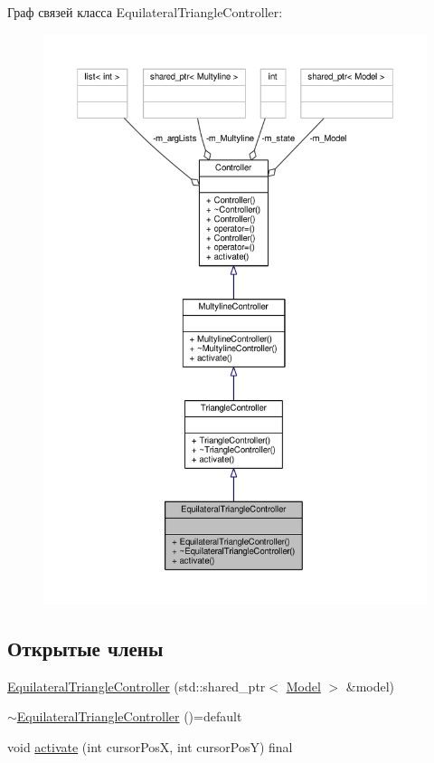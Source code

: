 Граф связей класса Equilateral\-Triangle\-Controller\-:
\nopagebreak
\begin{figure}[H]
\begin{center}
\leavevmode
\includegraphics[width=350pt]{class_equilateral_triangle_controller__coll__graph}
\end{center}
\end{figure}
\subsection*{Открытые члены}
\begin{DoxyCompactItemize}
\item 
\hyperlink{class_equilateral_triangle_controller_a823715abcc954d05ea572f5527744e91}{Equilateral\-Triangle\-Controller} (std\-::shared\-\_\-ptr$<$ \hyperlink{class_model}{Model} $>$ \&model)
\item 
\hyperlink{class_equilateral_triangle_controller_a9cba9b68e881d99f6342f08ec3a8b64c}{$\sim$\-Equilateral\-Triangle\-Controller} ()=default
\item 
void \hyperlink{class_equilateral_triangle_controller_ac8822ad6419def097652fc8a88426898}{activate} (int cursor\-Pos\-X, int cursor\-Pos\-Y) final
\end{DoxyCompactItemize}


